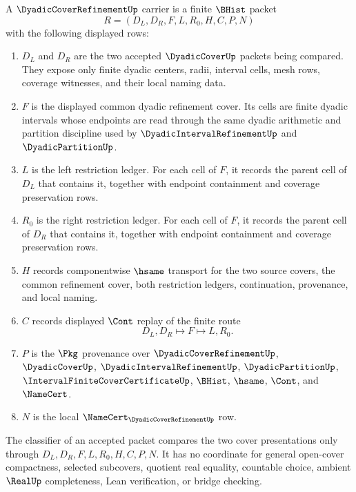 \begin{definition}
\label{def:dyadic-cover-refinement-carrier}
A $\DyadicCoverRefinementUp$ carrier is a finite $\BHist$ packet
$$
R=(D_L,D_R,F,L,R_0,H,C,P,N)
$$
with the following displayed rows:
\begin{enumerate}
\item $D_L$ and $D_R$ are the two accepted $\DyadicCoverUp$ packets being compared. They expose only finite dyadic centers, radii, interval cells, mesh rows, coverage witnesses, and their local naming data.
\item $F$ is the displayed common dyadic refinement cover. Its cells are finite dyadic intervals whose endpoints are read through the same dyadic arithmetic and partition discipline used by $\DyadicIntervalRefinementUp$ and $\DyadicPartitionUp$.
\item $L$ is the left restriction ledger. For each cell of $F$, it records the parent cell of $D_L$ that contains it, together with endpoint containment and coverage preservation rows.
\item $R_0$ is the right restriction ledger. For each cell of $F$, it records the parent cell of $D_R$ that contains it, together with endpoint containment and coverage preservation rows.
\item $H$ records componentwise $\hsame$ transport for the two source covers, the common refinement cover, both restriction ledgers, continuation, provenance, and local naming.
\item $C$ records displayed $\Cont$ replay of the finite route
$$
D_L,D_R\longmapsto F\longmapsto L,R_0 .
$$
\item $P$ is the $\Pkg$ provenance over $\DyadicCoverRefinementUp$, $\DyadicCoverUp$, $\DyadicIntervalRefinementUp$, $\DyadicPartitionUp$, $\IntervalFiniteCoverCertificateUp$, $\BHist$, $\hsame$, $\Cont$, and $\NameCert$.
\item $N$ is the local $\NameCert_{\DyadicCoverRefinementUp}$ row.
\end{enumerate}
The classifier of an accepted packet compares the two cover presentations only through $D_L,D_R,F,L,R_0,H,C,P,N$. It has no coordinate for general open-cover compactness, selected subcovers, quotient real equality, countable choice, ambient $\RealUp$ completeness, Lean verification, or bridge checking.
\end{definition}

